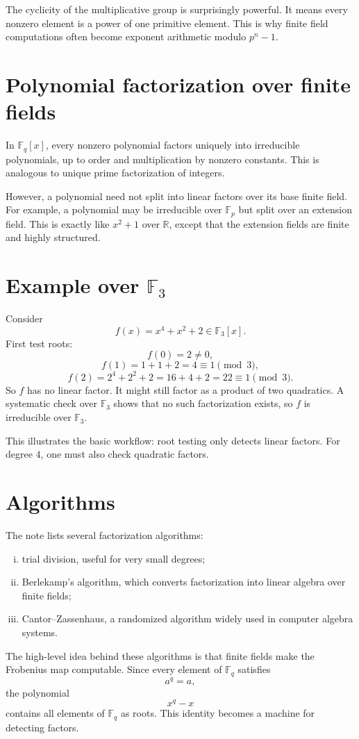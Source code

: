 The cyclicity of the multiplicative group is surprisingly powerful.  It means every nonzero element is a power of one primitive element.  This is why finite field computations often become exponent arithmetic modulo \(p^n-1\).

\section{Polynomial factorization over finite fields}

In \(\mathbb F_q[x]\), every nonzero polynomial factors uniquely into irreducible polynomials, up to order and multiplication by nonzero constants.  This is analogous to unique prime factorization of integers.

However, a polynomial need not split into linear factors over its base finite field.  For example, a polynomial may be irreducible over \(\mathbb F_p\) but split over an extension field.  This is exactly like \(x^2+1\) over \(\mathbb R\), except that the extension fields are finite and highly structured.

\section[Example over F\_3]{Example over \(\mathbb F_3\)}

Consider
\[
  f(x)=x^4+x^2+2\in\mathbb F_3[x].
\]
First test roots:
\[
  f(0)=2\neq0,
\]
\[
  f(1)=1+1+2=4\equiv1\pmod3,
\]
\[
  f(2)=2^4+2^2+2=16+4+2=22\equiv1\pmod3.
\]
So \(f\) has no linear factor.  It might still factor as a product of two quadratics.  A systematic check over \(\mathbb F_3\) shows that no such factorization exists, so \(f\) is irreducible over \(\mathbb F_3\).

This illustrates the basic workflow: root testing only detects linear factors.  For degree \(4\), one must also check quadratic factors.

\section{Algorithms}

The note lists several factorization algorithms:
\begin{enumerate}[(i)]
  \item trial division, useful for very small degrees;
  \item Berlekamp's algorithm, which converts factorization into linear algebra over finite fields;
  \item Cantor--Zassenhaus, a randomized algorithm widely used in computer algebra systems.

\end{enumerate}
The high-level idea behind these algorithms is that finite fields make the Frobenius map computable.  Since every element of \(\mathbb F_q\) satisfies
\[
  a^q=a,
\]
the polynomial
\[
  x^q-x
\]
contains all elements of \(\mathbb F_q\) as roots.  This identity becomes a machine for detecting factors.

